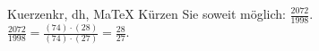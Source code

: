 \begin{MAufgabe}{Kuerzen}{kr, dh, MaTeX}
K\"urzen Sie soweit m\"oglich: $\frac{2072}{1998}$.\\ 
\ifLsg\MLoesung
\quad $\frac{2072}{1998}=\frac{(74)\cdot(28)}{(74)\cdot(27)}=\frac{28}{27}$.\else\relax\fi
 \end{MAufgabe}